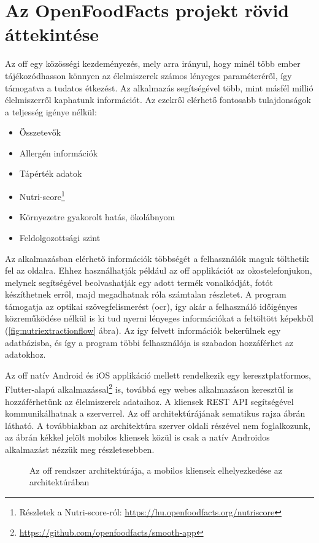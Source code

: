 \chapter{Az OpenFoodFacts projekt rövid áttekintése}

Az \acrlong{off} egy közösségi kezdeményezés, mely arra irányul, hogy minél több ember
tájékozódhasson könnyen az élelmiszerek számos lényeges paraméteréről, így támogatva a
tudatos étkezést. Az alkalmazás segítségével több, mint másfél millió élelmiszerről kaphatunk
információt. Az ezekről elérhető fontosabb tulajdonságok a teljesség igénye nélkül:
\begin{itemize}
 \item Összetevők
 \item Allergén információk
 \item Tápérték adatok
 \item Nutri-score\footnote{Részletek a Nutri-score-ról: \url{https://hu.openfoodfacts.org/nutriscore}}
 \item Környezetre gyakorolt hatás, ökolábnyom
 \item Feldolgozottsági szint
\end{itemize}


Az alkalmazásban elérhető információk többségét a felhasználók maguk tölthetik fel az oldalra.
Ehhez használhatják például az \acrlong{off} applikációt az okostelefonjukon, melynek segítségével
beolvashatják egy adott termék vonalkódját, fotót készíthetnek erről, majd megadhatnak róla számtalan
részletet. A program támogatja az optikai szövegfelismerést (\acrfull{ocr}),
így akár a felhasználó időigényes közreműködése nélkül is ki tud nyerni lényeges információkat a
feltöltött képekből (\ref{fig:nutriextractionflow} ábra). Az így felvett információk bekerülnek egy adatbázisba, és így a program többi
felhasználója is szabadon hozzáférhet az adatokhoz.

Az \acrlong{off} natív Android és iOS applikáció mellett rendelkezik egy keresztplatformos,
Flutter-alapú alkalmazással\footnote{\url{https://github.com/openfoodfacts/smooth-app}} is, továbbá egy webes alkalmazáson keresztül is hozzáférhetünk az
élelmiszerek adataihoz. A kliensek REST API segítségével kommunikálhatnak a %
szerverrel. Az \acrlong{off} architektúrájának sematikus rajza \az{\ref{fig:offarchitektura}}
ábrán látható. A továbbiakban az architektúra szerver oldali részével nem foglalkozunk, az
ábrán kékkel jelölt mobilos kliensek közül is csak a natív Androidos alkalmazást nézzük meg részletesebben.

\begin{figure}[h]
\centering

\caption{\centering Az \acrlong{off} rendszer architektúrája, a mobilos kliensek elhelyezkedése az architektúrában}
\label{fig:offarchitektura}
\end{figure}
